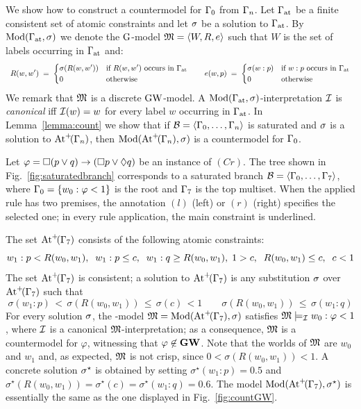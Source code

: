 \noindent
We show how to construct a countermodel for $\Gamma_0$ from $\Gamma_n$.  Let
$\Gamma_\mathrm{at}$ be a finite consistent set of atomic constraints and let $\sigma$
be a solution to $\Gamma_\mathrm{at}$.  By $\mathrm{Mod}(\Gamma_\mathrm{at},\sigma)$ we denote the
$\mbox{$\mathrm{G}$}$-model $\mathfrak{M}=\langle W,R,e \rangle$ such that $W$ is the set of labels
occurring in $\Gamma_\mathrm{at}$ and:
\[\small
\begin{array}{l}
  R(w,w') \;=\;
  \begin{cases}
    \sigma(R(w,w')) & \mbox{if $R(w,w')$ occurs in $\Gamma_\mathrm{at}$}  
    \\
    0 & \mbox{otherwise}
  \end{cases}
  \qquad
  e(w,p) \;=\;
  \begin{cases}
    \sigma(w:p) & \mbox{if $w:p$ occurs in $\Gamma_\mathrm{at}$}  
    \\
    0 & \mbox{otherwise}
  \end{cases}
\end{array}
\]
We remark that $\mathfrak{M}$ is a discrete $\mbox{$\mathrm{GW}$}$-model.  A
$\mathrm{Mod}(\Gamma_\mathrm{at},\sigma)$-interpretation $\mathcal{I}$ is \emph{canonical} iff
$\mathcal{I}(w)=w$ for every label $w$ occurring in $\Gamma_\mathrm{at}$. In
Lemma~\ref{lemma:count} we show that if $\mathcal{B}=\langle \Gamma_0,\dots,\Gamma_n \rangle$
is saturated and $\sigma$ is a solution to $\mathrm{At}^{+}\!(\Gamma_n)$, then
$\mathrm{Mod}(\mathrm{At}^{+}\!(\Gamma_n),\sigma)$ is a countermodel for $\Gamma_0$.


\begin{example}\label{ex:satBrancj}
  Let $\varphi=\Box(p\lor q) \to (\Box p\lor \lozenge q)$ be an instance
  of $(Cr)$.  The tree shown in Fig.~\ref{fig:saturatedbranch}
  corresponds to a saturated branch $\mathcal{B}=\langle \Gamma_0,\dots,\Gamma_7 \rangle$,
  where $\Gamma_0=\{w_0:\varphi < 1\}$ is the root and $\Gamma_7$ is the top
  multiset.  When the applied rule has two premises, the annotation
  $(l)$ (left) or $(r)$ (right) specifies the selected one; in every
  rule application, the main constraint is underlined.

  The set $\mathrm{At}^{+}\!(\Gamma_7)$ consists of the following atomic constraints:
  \[\small
  w_1:p<R(w_0,w_1),\;\; w_1:p\leq c, \;\; w_1 : q \geq R(w_0,w_1),\;
  1> c,\;\; R(w_0,w_1)\leq c,\;\; c < 1
  \]
  The set $\mathrm{At}^{+}\!(\Gamma_7)$ is consistent; a solution to $\mathrm{At}^{+}\!(\Gamma_7)$ is
  any substitution $\sigma$ over $\mathrm{At}^{+}\!(\Gamma_7)$ such that
  \[
  \sigma(w_1:p)\, < \,\sigma\left(R(w_0,w_1)\right)\,\leq\, \sigma(c) \,< 1
  \qquad
  \sigma\left(R(w_0,w_1)\right)\,\leq \, \sigma(w_1: q) %
  \]
  For every solution $\sigma$, the \GWM-model $\mathfrak{M}=\mathrm{Mod}(\mathrm{At}^{+}\!(\Gamma_7),\sigma)$
  satisfies $\mathfrak{M} \models_{\mathcal{I}} w_0 :\varphi < 1$, where $\mathcal{I}$ is a
  canonical $\mathfrak{M}$-interpretation; as a consequence, $\mathfrak{M}$ is a countermodel for
  $\varphi$, witnessing that $\varphi\not\in\mathbf{GW}$.
  Note that the worlds of $\mathfrak{M}$ are $w_0$ and $w_1$ and,
  as expected, $\mathfrak{M}$ is not crisp, since $0 < \sigma(R(w_0,w_1)) < 1$.
    A concrete solution
  $\sigma^\star$ is obtained by setting $\sigma^\star(w_1:p) = 0.5$ and
  $\sigma^\star(R(w_0,w_1))= \sigma^\star(c) = \sigma^\star(w_1:q) =
  0.6$.  The model $\mathrm{Mod}(\mathrm{At}^{+}\!(\Gamma_7),\sigma^\star)$ is essentially the
  same as the one displayed in Fig.~\ref{fig:countGW}.
  \EndEx
\end{example}



